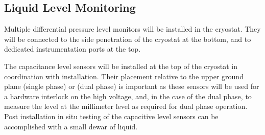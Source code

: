 \subsection{Liquid Level Monitoring}
\label{sec:fdgen-slow-cryo-install-llm}

% 
% 

Multiple differential pressure level monitors will be installed in the
cryostat.  They will be connected to the side
penetration of the cryostat at the bottom, and to dedicated
instrumentation ports at the top.

The capacitance level sensors will be installed at the top of the
cryostat in coordination with  installation.  Their
placement relative to the upper ground plane (single phase) or
 (dual phase) is important as these sensors will be used for a
hardware interlock on the high voltage, and, in the case of the dual
phase, to measure the \lar level at the millimeter level as required
for dual phase operation.
Post installation in situ testing of the capacitive level sensors can be
accomplished with a small dewar of liquid.


